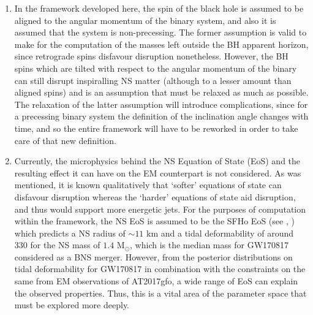         \begin{enumerate}

            \item In the framework developed here, the spin of the black hole is
                assumed to be aligned to the angular momentum of the binary system, and
                also it is assumed that the system is non-precessing. The former
                assumption is valid to make for the computation of the masses left
                outside the BH apparent horizon, since retrograde spins disfavour
                disruption nonetheless. However, the BH spins which are tilted with
                respect to the angular momentum of the binary can still disrupt
                inspiralling NS matter (although to a lesser amount than aligned spins)
                and is an assumption that must be relaxed as much as possible. The
                relaxation of the latter assumption will introduce complications, since
                for a precessing binary system the definition of the inclination angle
                changes with time, and so the entire framework will have to be reworked
                in order to take care of that new definition.

            \item Currently, the microphysics behind the NS Equation of State (EoS) and
                the resulting effect it can have on the EM counterpart is not
                considered.  As was mentioned, it is known qualitatively that `softer'
                equations of state can disfavour disruption whereas the `harder'
                equations of state aid disruption, and thus would support more energetic
                jets. For the purposes of computation within the framework, the NS EoS
                is assumed to be the SFHo EoS (see \cite{hempel_2010},
                \cite{hempel_2012}) which predicts a NS radius of $\sim 11$ km and a
                tidal deformability of around 330 for the NS mass of $1.4$ M$_\odot$,
                which is the median mass for GW170817 considered as a BNS merger.
                However, from the posterior distributions on tidal deformability for
                GW170817 in combination with the constraints on the same from EM
                observations of AT2017gfo, a wide range of EoS can explain the observed
                properties. Thus, this is a vital area of the parameter space that must
                be explored more deeply.


\end{enumerate}
